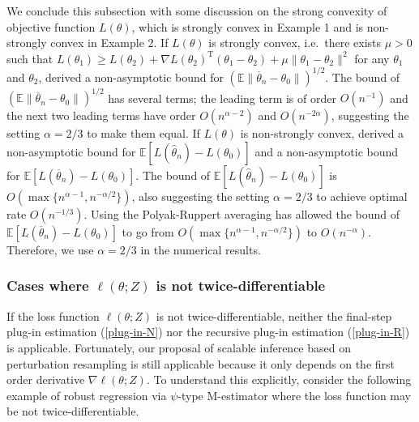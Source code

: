 \documentclass[twoside,11pt]{article}
\def\trans{^{ \mathrm{\scriptscriptstyle T} }}
\def\wh{\widehat}
\def\ol{\overline}
\begin{document}
We conclude this subsection with some discussion on the strong convexity of objective function $L(\theta)$, which is strongly convex in Example 1 and is non-strongly convex in Example 2. If $L(\theta)$ is strongly convex, i.e.~there exists $\mu>0$ such that $L(\theta_1)\geq L(\theta_2)+\nabla L(\theta_2)\trans(\theta_1-\theta_2)+\mu\|\theta_1-\theta_2\|^2$ for any $\theta_1$ and $\theta_2$, \citet{Moulines11} derived a non-asymptotic bound for $(\mathbb{E}\|\ol{\theta}_n-\theta_0\|)^{1/2}$. The bound of $(\mathbb{E}\|\ol{\theta}_n-\theta_0\|)^{1/2}$ has several terms; the leading term is of order $O(n^{-1})$ and the next two leading terms have order $O(n^{\alpha-2})$ and $O(n^{-2\alpha})$, suggesting the setting $\alpha=2/3$ to make them equal. If $L(\theta)$ is non-strongly convex, \citet{Moulines11} derived a non-asymptotic bound for $\mathbb{E}[L(\wh{\theta}_n)-L(\theta_0)]$ and a non-asymptotic bound for $\mathbb{E}[L(\ol{\theta}_n)-L(\theta_0)]$. The bound of $\mathbb{E}[L(\wh{\theta}_n)-L(\theta_0)]$ is $O(\max\{n^{\alpha-1}, n^{-\alpha/2}\})$, also suggesting the setting $\alpha=2/3$ to achieve optimal rate $O(n^{-1/3})$. Using the Polyak-Ruppert averaging has allowed the bound of $\mathbb{E}[L(\ol{\theta}_n)-L(\theta_0)]$ to go from $O(\max\{n^{\alpha-1}, n^{-\alpha/2}\})$ to $O(n^{-\alpha})$. Therefore, we use $\alpha=2/3$ in the numerical results.

\subsubsection{Cases where $\ell(\theta; Z)$ is not twice-differentiable}

If the loss function $\ell(\theta; Z)$ is not twice-differentiable, neither the final-step plug-in estimation (\ref{plug-in-N}) nor the recursive plug-in estimation (\ref{plug-in-R}) is applicable. Fortunately, our proposal of scalable inference based on perturbation resampling is still applicable because it only depends on the first order derivative $\nabla \ell(\theta; Z)$. To understand this explicitly, consider the following example of robust regression via $\psi$-type M-estimator where the loss function may be not twice-differentiable.
\end{document}
